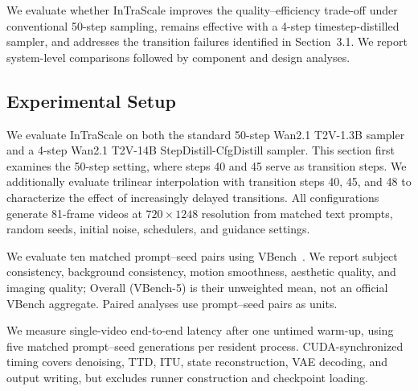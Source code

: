 \documentclass[letterpaper]{article} %
\begin{document}
We evaluate whether InTraScale improves the quality--efficiency trade-off
under conventional 50-step sampling, remains effective with a
4-step timestep-distilled sampler, and addresses the transition
failures identified in
Section~3.1. We report system-level comparisons followed by component and 
design analyses.

\subsection{Experimental Setup}
\label{sec:experimental_setup}

We evaluate InTraScale on both the standard 50-step Wan2.1 T2V-1.3B
sampler and a 4-step Wan2.1 T2V-14B StepDistill-CfgDistill sampler.
This section first examines the 50-step setting, where steps 40
and 45 serve as transition steps. We additionally evaluate trilinear
interpolation with transition steps 40, 45, and 48 to characterize the
effect of increasingly delayed transitions. All configurations generate
81-frame videos at \(720\times1248\) resolution from matched text prompts,
random seeds, initial noise, schedulers, and guidance settings.

We evaluate ten matched prompt--seed pairs using VBench~\citep{huang2024vbench}. We report subject
consistency, background consistency, motion smoothness, aesthetic quality, and
imaging quality; Overall (VBench-5) is their unweighted mean, not an official
VBench aggregate. Paired analyses use prompt--seed pairs as units.

We measure single-video end-to-end latency after one untimed warm-up,
using five matched prompt--seed generations per resident process. CUDA-synchronized
timing covers denoising, TTD, ITU, state reconstruction, VAE decoding, and output
writing, but excludes runner construction and checkpoint loading.
\end{document}
